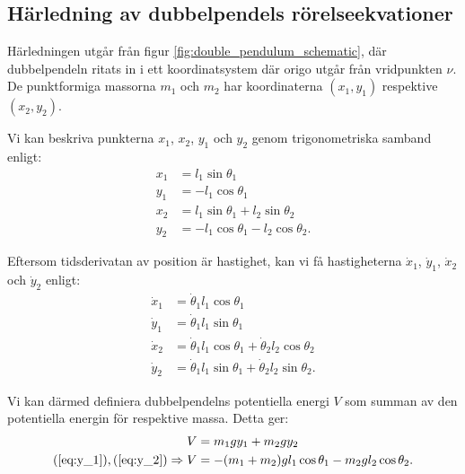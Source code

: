 \subsection{Härledning av dubbelpendels rörelseekvationer} \label{sec:härledning_av_dubbelpendeln}

Härledningen utgår från figur \ref{fig:double_pendulum_schematic}, där dubbelpendeln ritats in i ett koordinatsystem där origo utgår från vridpunkten $\nu$. De punktformiga massorna $m_1$ och $m_2$ har koordinaterna $(x_1,y_1)$ respektive $(x_2,y_2)$.

Vi kan beskriva punkterna $x_1$, $x_2$, $y_1$ och $y_2$ genom trigonometriska samband enligt:
\begin{align}
    x_1 & = l_1 \sin{\theta_1} \label{eq:x_1}                      \\
    y_1 & = -l_1\cos{\theta_1} \label{eq:y_1}                      \\
    x_2 & = l_1\sin{\theta_1} + l_2\sin{\theta_2} \label{eq:x_2}   \\
    y_2 & = -l_1\cos{\theta_1} - l_2\cos{\theta_2}. \label{eq:y_2}
\end{align}

Eftersom tidsderivatan av position är hastighet, kan vi få hastigheterna $\dot{x}_1$, $\dot{y}_1$, $\dot{x}_2$ och $\dot{y}_2$ enligt:
\begin{align}
    \dot{x}_1 & = \dot{\theta}_1 l_1 \cos{\theta_1} \label{eq:x_1:dot}                   \\
    \dot{y}_1 & = \dot{\theta}_1 l_1 \sin{\theta_1} \label{eq:y_1:dot}                   \\
    \dot{x}_2 & = \dot{\theta}_1 l_1 \cos{\theta_1} + \dot{\theta}_2 l_2 \cos{\theta_2} \label{eq:x_2:dot}  \\
    \dot{y}_2 & = \dot{\theta}_1 l_1 \sin{\theta_1} + \dot{\theta}_2 l_2 \sin{\theta_2}. \label{eq:y_2:dot}
\end{align}

Vi kan därmed definiera dubbelpendelns potentiella energi $V$ som summan av den potentiella energin för respektive massa. Detta ger:
\begin{align}
    V                                              & = m_1gy_1 + m_2gy_2 \notag                                                       \\
    (\ref{eq:y_1}),\/ (\ref{eq:y_2}) \Rightarrow V & = -(m_1 + m_2)gl_1\cos{\theta_1} - m_2gl_2\cos{\theta_2}. \label{eq:V/potential_energy}
\end{align}


